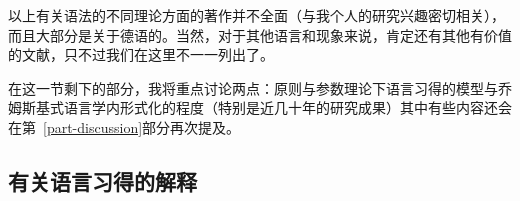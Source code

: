 以上有关语法的不同理论方面的著作并不全面（与我个人的研究兴趣密切相关），而且大部分是关于德语的。当然，对于其他语言和现象来说，肯定还有其他有价值的文献，只不过我们在这里不一一列出了。

在这一节剩下的部分，我将重点讨论两点：原则与参数理论下语言习得的模型与乔姆斯基式语言学内形式化的程度（特别是近几十年的研究成果）其中有些内容还会在第~\ref{part-discussion}部分再次提及。

\subsection{有关语言习得的解释}
\label{sec-acquisition-gb}

